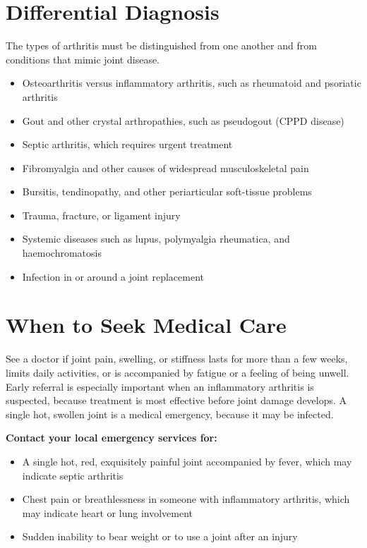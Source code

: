 \section*{Differential Diagnosis}
The types of arthritis must be distinguished from one another and from conditions that mimic joint disease.

\begin{itemize}
    \item Osteoarthritis versus inflammatory arthritis, such as rheumatoid and psoriatic arthritis
    \item Gout and other crystal arthropathies, such as pseudogout (CPPD disease)
    \item Septic arthritis, which requires urgent treatment
    \item Fibromyalgia and other causes of widespread musculoskeletal pain
    \item Bursitis, tendinopathy, and other periarticular soft-tissue problems
    \item Trauma, fracture, or ligament injury
    \item Systemic diseases such as lupus, polymyalgia rheumatica, and haemochromatosis
    \item Infection in or around a joint replacement
\end{itemize}

\section*{When to Seek Medical Care}
See a doctor if joint pain, swelling, or stiffness lasts for more than a few weeks, limits daily activities, or is accompanied by fatigue or a feeling of being unwell. Early referral is especially important when an inflammatory arthritis is suspected, because treatment is most effective before joint damage develops. A single hot, swollen joint is a medical emergency, because it may be infected.

\textbf{Contact your local emergency services for:}
\begin{itemize}
    \item A single hot, red, exquisitely painful joint accompanied by fever, which may indicate septic arthritis
    \item Chest pain or breathlessness in someone with inflammatory arthritis, which may indicate heart or lung involvement
    \item Sudden inability to bear weight or to use a joint after an injury
\end{itemize}

